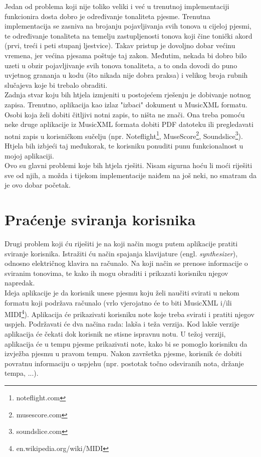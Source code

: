 \documentclass[times, utf8, seminar, numeric]{fer}
\begin{document}
Jedan od problema koji nije toliko veliki i već u trenutnoj implementaciji funkcionira dosta dobro je određivanje tonaliteta pjesme. Trenutna implementacija se zasniva na brojanju pojavljivanja svih tonova u cijeloj pjesmi, te određivanje tonaliteta na temelju zastupljenosti tonova koji čine tonički akord (prvi, treći i peti stupanj ljestvice). Takav pristup je dovoljno dobar većinu vremena, jer većina pjesama poštuje taj zakon. Međutim, nekada bi dobro bilo uzeti u obzir pojavljivanje svih tonova tonaliteta, a to onda dovodi do puno uvjetnog grananja u kodu (što nikada nije dobra praksa) i velikog broja rubnih slučajeva koje bi trebalo obraditi.\\

Zadnja stvar koju bih htjela izmjeniti u postojećem rješenju je dobivanje notnog zapisa. Trenutno, aplikacija kao izlaz "izbaci" dokument u MusicXML formatu. Osobi koja želi dobiti čitljivi notni zapis, to ništa ne znači. Ona treba pomoću neke druge aplikacije iz MusicXML formata dobiti PDF datoteku ili pregledavati notni zapis u korisničkom sučelju (npr. Noteflight\footnote{noteflight.com}, MuseScore\footnote{musescore.com}, Soundslice\footnote{soundslice.com}). Htjela bih izbjeći taj međukorak, te korisniku ponuditi punu funkcionalnost u mojoj aplikaciji.\\

Ovo su glavni problemi koje bih htjela rješiti. Nisam sigurna hoću li moći riješiti sve od njih, a možda i tijekom implementacije naiđem na još neki, no smatram da je ovo dobar početak.

\section{Praćenje sviranja korisnika}
Drugi problem koji ću riješiti je na koji način mogu putem aplikacije pratiti sviranje korisnika. Istražiti ću način spajanja klavijature (engl. \textit{synthesizer}), odnosno električnog klavira na računalo. Na koji način se prenose informacije o sviranim tonovima, te kako ih mogu obraditi i prikazati korisniku njegov napredak.\\

Ideja aplikacije je da korisnik unese pjesmu koju želi naučiti svirati u nekom formatu koji podržava računalo (vrlo vjerojatno će to biti MusicXML i/ili MIDI\footnote{en.wikipedia.org/wiki/MIDI}). Aplikacija će prikazivati korisniku note koje treba svirati i pratiti njegov uspjeh. Podržavati će dva načina rada: lakša i teža verzija. Kod lakše verzije aplikacija će čekati dok korisnik ne stisne ispravnu notu. U težoj verziji, aplikacija će u tempu pjesme prikazivati note, kako bi se pomoglo korisniku da izvježba pjesmu u pravom tempu. Nakon završetka pjesme, korisnik će dobiti povratnu informaciju o uspjehu (npr. postotak točno odsviranih nota, držanje tempa, ...).\\
\end{document}
